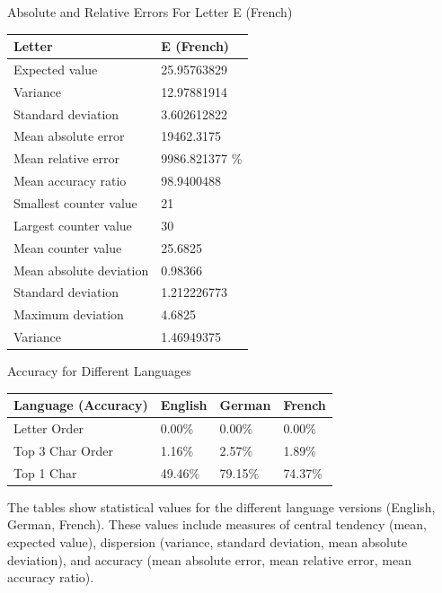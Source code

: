 \documentclass[]{revdetua}
\begin{document}
\begin{table}[!ht]
    \centering
    Absolute and Relative Errors For Letter E (French)
    \begin{tabular}{|l|l|}
    \hline
        Letter & E (French) \\ \hline
        Expected value & 25.95763829 \\ \hline
        Variance & 12.97881914 \\ \hline
        Standard deviation & 3.602612822 \\ \hline
        Mean absolute error & 19462.3175 \\ \hline
        Mean relative error & 9986.821377 \% \\ \hline
        Mean accuracy ratio & 98.9400488 \\ \hline
        Smallest counter value & 21 \\ \hline
        Largest counter value & 30 \\ \hline
        Mean counter value & 25.6825 \\ \hline
        Mean absolute deviation & 0.98366 \\ \hline
        Standard deviation & 1.212226773 \\ \hline
        Maximum deviation & 4.6825 \\ \hline
        Variance & 1.46949375 \\ \hline
    \end{tabular}
\end{table}

\begin{table}[!ht]
    \centering
    Accuracy for Different Languages
    \begin{tabular}{|l|l|l|l|}
    \hline
        Language (Accuracy) & English & German & French \\ \hline
        Letter Order & 0.00\% & 0.00\% & 0.00\% \\ \hline
        Top 3 Char Order & 1.16\% & 2.57\% & 1.89\% \\ \hline
        Top 1 Char & 49.46\% & 79.15\% & 74.37\% \\ \hline
    \end{tabular}
\end{table}

\pagebreak

The tables show statistical values for the different language versions (English, German, French). These values include measures of central tendency (mean, expected value), dispersion (variance, standard deviation, mean absolute deviation), and accuracy (mean absolute error, mean relative error, mean accuracy ratio).
\end{document}
